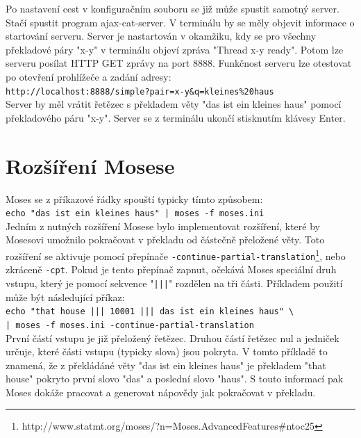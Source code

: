 \documentclass[12pt,a4paper]{report}
\def\parcite#1{\cite{#1}}  %
\begin{document}
Po nastavení cest v konfiguračním souboru se již může spustit samotný server. Stačí spustit program ajax-cat-server. V terminálu by se měly objevit informace o startování serveru. Server je nastartován v okamžiku, kdy se pro všechny překladové páry "x-y" v terminálu objeví zpráva "Thread x-y ready". Potom lze serveru posílat HTTP GET zprávy na port 8888. Funkčnost serveru lze otestovat po otevření prohlížeče a zadání adresy: \\

{\tt http://localhost:8888/simple?pair=x-y\&q=kleines\%20haus} \\

Server by měl vrátit řetězec s překladem věty "das ist ein kleines haus" pomocí překladového páru "x-y". Server se z terminálu ukončí stisknutím klávesy Enter.

\section{Rozšíření Mosese}

Moses se z příkazové řádky spouští typicky tímto způsobem: \\

{\tt echo "das ist ein kleines haus" | moses -f moses.ini } \\

Jedním z nutných rozšíření Mosese bylo implementovat rozšíření, které by Mosesovi umožnilo pokračovat v překladu od částečně přeložené věty. Toto rozšíření se aktivuje pomocí přepínače {\tt -continue-partial-translation}\footnote{http://www.statmt.org/moses/?n=Moses.AdvancedFeatures\#ntoc25}, nebo zkráceně {\tt -cpt}. Pokud je tento přepínač zapnut, očekává Moses speciální druh vstupu, který je pomocí sekvence "{\tt |||}" rozdělen na tři části. Příkladem použití může být následující příkaz: \\

{\tt echo "that house ||| 10001 ||| das ist ein kleines haus" \textbackslash \\ | moses -f moses.ini -continue-partial-translation } \\

První částí vstupu je již přeložený řetězec. Druhou částí řetězec nul a jedniček určuje, které části vstupu (typicky slova) jsou pokryta. V tomto příkladě to znamená, že z překládáné věty "das ist ein kleines haus" je překladem "that house" pokryto první slovo "das" a poslední slovo "haus". S touto informací pak Moses dokáže pracovat a generovat nápovědy jak pokračovat v překladu.
\end{document}
